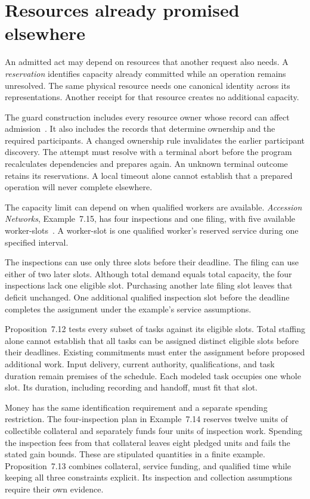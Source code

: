 \documentclass{momentum}
\begin{document}
\section{Resources already promised elsewhere}
\label{sec:resources}

An admitted act may depend on resources that another request also needs.
A \emph{reservation} identifies capacity already committed while an operation remains unresolved.
The same physical resource needs one canonical identity across its representations.
Another receipt for that resource creates no additional capacity.

The guard construction includes every resource owner whose record can affect admission~\cite[Section~5.1]{sjn}.
It also includes the records that determine ownership and the required participants.
A changed ownership rule invalidates the earlier participant discovery.
The attempt must resolve with a terminal abort before the program recalculates dependencies and prepares again.
An unknown terminal outcome retains its reservations.
A local timeout alone cannot establish that a prepared operation will never complete elsewhere.

The capacity limit can depend on when qualified workers are available.
\emph{Accession Networks}, Example~7.15, has four inspections and one filing, with five available worker-slots~\cite{accession}.
A worker-slot is one qualified worker's reserved service during one specified interval.

The inspections can use only three slots before their deadline.
The filing can use either of two later slots.
Although total demand equals total capacity, the four inspections lack one eligible slot.
Purchasing another late filing slot leaves that deficit unchanged.
One additional qualified inspection slot before the deadline completes the assignment under the example's service assumptions.

Proposition~7.12 tests every subset of tasks against its eligible slots.
Total staffing alone cannot establish that all tasks can be assigned distinct eligible slots before their deadlines.
Existing commitments must enter the assignment before proposed additional work.
Input delivery, current authority, qualifications, and task duration remain premises of the schedule.
Each modeled task occupies one whole slot.
Its duration, including recording and handoff, must fit that slot.

Money has the same identification requirement and a separate spending restriction.
The four-inspection plan in Example~7.14 reserves twelve units of collectible collateral and separately funds four units of inspection work.
Spending the inspection fees from that collateral leaves eight pledged units and fails the stated gain bounds.
These are stipulated quantities in a finite example.
Proposition~7.13 combines collateral, service funding, and qualified time while keeping all three constraints explicit.
Its inspection and collection assumptions require their own evidence.
\end{document}
